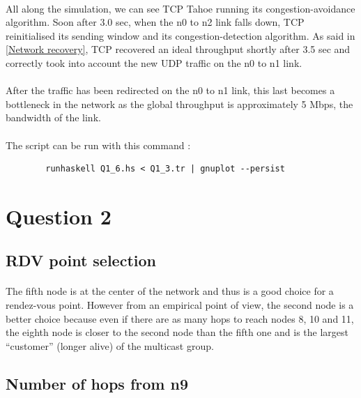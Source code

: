 \documentclass[a4paper]{article}
\begin{document}
    \paragraph{}All along the simulation, we can see TCP Tahoe running its
congestion-avoidance algorithm. \newline
Soon after 3.0 sec, when the n0 to n2 link falls down, TCP reinitialised its
sending window and its congestion-detection algorithm. As said in
\ref{Network recovery}, TCP recovered an ideal throughput shortly after 3.5 sec
and correctly took into account the new UDP traffic on the n0 to n1 link.

    \paragraph{}After the traffic has been redirected on the n0 to n1
link, this last becomes a bottleneck in the network as the global throughput is
approximately 5 Mbps, the bandwidth of the link.

    \paragraph{}The script can be run with this command :
    \begin{verbatim}
        runhaskell Q1_6.hs < Q1_3.tr | gnuplot --persist
    \end{verbatim}

  \section{Question 2}

    \subsection{RDV point selection}

    \paragraph{}The fifth node is at the center of the network and thus is a
good choice for a rendez-vous point.
However from an empirical point of view, the second node is a better choice
because even if there are as many hops to reach nodes 8, 10 and 11, the eighth
node is closer to the second node than the fifth one and is the largest
\enquote{customer} (longer alive) of the multicast group.

  \subsection{Number of hops from n9}
\end{document}

